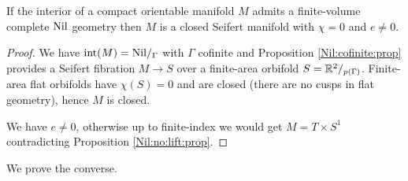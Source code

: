 \begin{cor} If the interior of a compact orientable manifold $M$ admits a finite-volume complete ${\rm Nil}$ geometry then $M$ is a closed Seifert manifold with $\chi=0$ and $e \neq 0$.
\end{cor}
\begin{proof}
We have ${\rm int}(M) = {\rm Nil}/_\Gamma$ with $\Gamma$ cofinite and Proposition \ref{Nil:cofinite:prop} provides a Seifert fibration $M\to S$ over a finite-area orbifold $S=\mathbb{R}^2/_{p(\Gamma)}$. Finite-area flat orbifolds have $\chi(S)=0$ and are closed (there are no cusps in flat geometry), hence $M$ is closed. 

We have $e\neq 0$, otherwise up to finite-index we would get $M = T\times S^1$ contradicting Proposition \ref{Nil:no:lift:prop}.
\end{proof}

We prove the converse.

